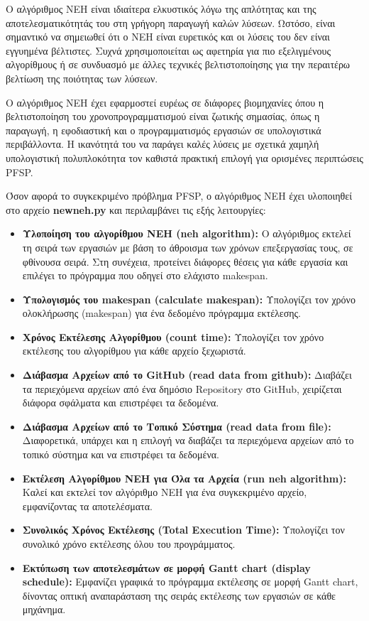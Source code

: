 \documentclass[paper=a4, fontsize=11pt]{scrartcl}
\numberwithin{equation}{section}		%
\numberwithin{figure}{section}			%
\numberwithin{table}{section}				%
\begin{document}
    Ο αλγόριθμος NEH είναι ιδιαίτερα ελκυστικός λόγω της απλότητας και της αποτελεσματικότητάς του στη γρήγορη παραγωγή καλών λύσεων. Ωστόσο, είναι σημαντικό να σημειωθεί ότι ο NEH είναι ευρετικός και οι λύσεις του δεν είναι εγγυημένα βέλτιστες. Συχνά χρησιμοποιείται ως αφετηρία για πιο εξελιγμένους αλγορίθμους ή σε συνδυασμό με άλλες τεχνικές βελτιστοποίησης για την περαιτέρω βελτίωση της ποιότητας των λύσεων.

    Ο αλγόριθμος NEH έχει εφαρμοστεί ευρέως σε διάφορες βιομηχανίες όπου η βελτιστοποίηση του χρονοπρογραμματισμού είναι ζωτικής σημασίας, όπως η παραγωγή, η εφοδιαστική και ο προγραμματισμός εργασιών σε υπολογιστικά περιβάλλοντα. Η ικανότητά του να παράγει καλές λύσεις με σχετικά χαμηλή υπολογιστική πολυπλοκότητα τον καθιστά πρακτική επιλογή για ορισμένες περιπτώσεις PFSP.

    Όσον αφορά το συγκεκριμένο πρόβλημα PFSP, ο αλγόριθμος NEH έχει υλοποιηθεί στο αρχείο \textbf{newneh.py} και περιλαμβάνει τις εξής λειτουργίες:

\begin{itemize}
  \item \textbf{Υλοποίηση του αλγορίθμου NEH (neh algorithm):} Ο αλγόριθμος εκτελεί τη σειρά των εργασιών με βάση το άθροισμα των χρόνων επεξεργασίας τους, σε φθίνουσα σειρά. Στη συνέχεια, προτείνει διάφορες θέσεις για κάθε εργασία και επιλέγει το πρόγραμμα που οδηγεί στο ελάχιστο makespan. 
  \item \textbf{Υπολογισμός του makespan (calculate makespan):} Υπολογίζει τον χρόνο ολοκλήρωσης (makespan) για ένα δεδομένο πρόγραμμα εκτέλεσης.
  \item \textbf{Χρόνος Εκτέλεσης Αλγορίθμου (count time):} Υπολογίζει τον χρόνο εκτέλεσης του αλγορίθμου για κάθε αρχείο ξεχωριστά. 
  \item \textbf{Διάβασμα Αρχείων από το GitHub (read data from github):} Διαβάζει τα περιεχόμενα αρχείων από ένα δημόσιο Repository στο GitHub, χειρίζεται διάφορα σφάλματα και επιστρέφει τα δεδομένα.
  \item \textbf{Διάβασμα Αρχείων από το Τοπικό Σύστημα (read data from file):} Διαφορετικά, υπάρχει και η επιλογή να διαβάζει τα περιεχόμενα αρχείων από το τοπικό σύστημα και να επιστρέφει τα δεδομένα.
  \item \textbf{Εκτέλεση Αλγορίθμου NEH για Όλα τα Αρχεία (run neh algorithm):} Καλεί και εκτελεί τον αλγόριθμο NEH για ένα συγκεκριμένο αρχείο, εμφανίζοντας τα αποτελέσματα.
  \item \textbf{Συνολικός Χρόνος Εκτέλεσης (Total Execution Time):} Υπολογίζει τον συνολικό χρόνο εκτέλεσης όλου του προγράμματος.
  \item \textbf{Εκτύπωση των αποτελεσμάτων σε μορφή Gantt chart (display schedule):} Εμφανίζει γραφικά το πρόγραμμα εκτέλεσης σε μορφή Gantt chart, δίνοντας οπτική αναπαράσταση της σειράς εκτέλεσης των εργασιών σε κάθε μηχάνημα.
\end{itemize}
\end{document}
